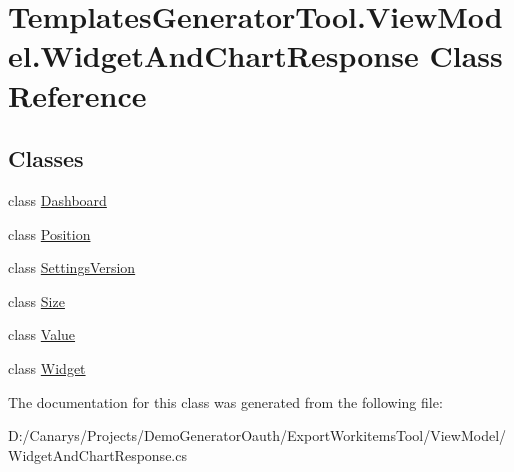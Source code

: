 \hypertarget{class_templates_generator_tool_1_1_view_model_1_1_widget_and_chart_response}{}\section{Templates\+Generator\+Tool.\+View\+Model.\+Widget\+And\+Chart\+Response Class Reference}
\label{class_templates_generator_tool_1_1_view_model_1_1_widget_and_chart_response}
\subsection*{Classes}
\begin{DoxyCompactItemize}
\item 
class \mbox{\hyperlink{class_templates_generator_tool_1_1_view_model_1_1_widget_and_chart_response_1_1_dashboard}{Dashboard}}
\item 
class \mbox{\hyperlink{class_templates_generator_tool_1_1_view_model_1_1_widget_and_chart_response_1_1_position}{Position}}
\item 
class \mbox{\hyperlink{class_templates_generator_tool_1_1_view_model_1_1_widget_and_chart_response_1_1_settings_version}{Settings\+Version}}
\item 
class \mbox{\hyperlink{class_templates_generator_tool_1_1_view_model_1_1_widget_and_chart_response_1_1_size}{Size}}
\item 
class \mbox{\hyperlink{class_templates_generator_tool_1_1_view_model_1_1_widget_and_chart_response_1_1_value}{Value}}
\item 
class \mbox{\hyperlink{class_templates_generator_tool_1_1_view_model_1_1_widget_and_chart_response_1_1_widget}{Widget}}
\end{DoxyCompactItemize}


The documentation for this class was generated from the following file\+:\begin{DoxyCompactItemize}
\item 
D\+:/\+Canarys/\+Projects/\+Demo\+Generator\+Oauth/\+Export\+Workitems\+Tool/\+View\+Model/Widget\+And\+Chart\+Response.\+cs\end{DoxyCompactItemize}
